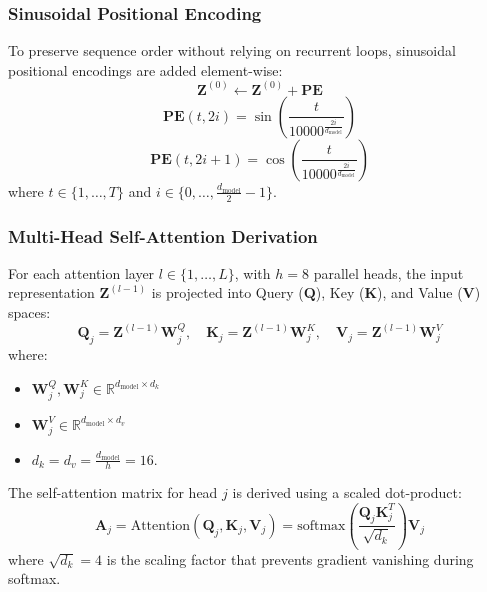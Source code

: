 \documentclass[10pt,journal,compsoc,twocolumn]{IEEEtran}
\begin{document}
\subsubsection{Sinusoidal Positional Encoding}
To preserve sequence order without relying on recurrent loops, sinusoidal positional encodings are added element-wise:
\begin{equation}
\mathbf{Z}^{(0)} \leftarrow \mathbf{Z}^{(0)} + \mathbf{PE}
\end{equation}
\begin{equation}
\mathbf{PE}(t, 2i) = \sin\left(\frac{t}{10000^{\frac{2i}{d_{\text{model}}}}}\right)
\end{equation}
\begin{equation}
\mathbf{PE}(t, 2i+1) = \cos\left(\frac{t}{10000^{\frac{2i}{d_{\text{model}}}}}\right)
\end{equation}
where $t \in \{1, \dots, T\}$ and $i \in \{0, \dots, \frac{d_{\text{model}}}{2} - 1\}$.

\subsubsection{Multi-Head Self-Attention Derivation}
For each attention layer $l \in \{1, \dots, L\}$, with $h = 8$ parallel heads, the input representation $\mathbf{Z}^{(l-1)}$ is projected into Query ($\mathbf{Q}$), Key ($\mathbf{K}$), and Value ($\mathbf{V}$) spaces:
\begin{equation}
\mathbf{Q}_j = \mathbf{Z}^{(l-1)}\mathbf{W}_j^Q, \quad \mathbf{K}_j = \mathbf{Z}^{(l-1)}\mathbf{W}_j^K, \quad \mathbf{V}_j = \mathbf{Z}^{(l-1)}\mathbf{W}_j^V
\end{equation}
where:
\begin{itemize}
    \item $\mathbf{W}_j^Q, \mathbf{W}_j^K \in \mathbb{R}^{d_{\text{model}} \times d_k}$
    \item $\mathbf{W}_j^V \in \mathbb{R}^{d_{\text{model}} \times d_v}$
    \item $d_k = d_v = \frac{d_{\text{model}}}{h} = 16$.
\end{itemize}

The self-attention matrix for head $j$ is derived using a scaled dot-product:
\begin{equation}
\mathbf{A}_j = \text{Attention}(\mathbf{Q}_j, \mathbf{K}_j, \mathbf{V}_j) = \text{softmax}\left(\frac{\mathbf{Q}_j\mathbf{K}_j^T}{\sqrt{d_k}}\right)\mathbf{V}_j
\end{equation}
where $\sqrt{d_k} = 4$ is the scaling factor that prevents gradient vanishing during softmax.
\end{document}

